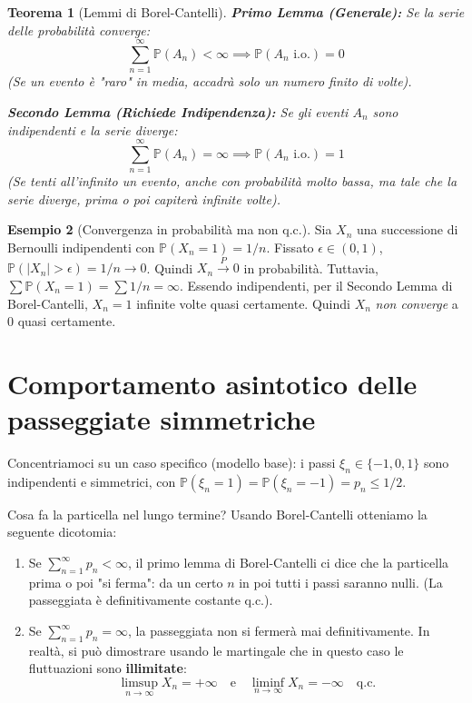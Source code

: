 \documentclass[11pt, a4paper]{report}
\theoremstyle{plain}
\newtheorem{theorem}{Teorema}[chapter]
\theoremstyle{definition}
\newtheorem{esempio}[theorem]{Esempio}
\theoremstyle{remark}
\newcommand{\PP}{\mathbb{P}}
\newcommand{\1}{\mathbf{1}}
\begin{document}
\begin{theorem}[Lemmi di Borel-Cantelli]
\textbf{Primo Lemma (Generale):} Se la serie delle probabilità converge:
\[ \sum_{n=1}^\infty \PP(A_n) < \infty \implies \PP(A_n \text{ i.o.}) = 0 \]
(Se un evento è "raro" in media, accadrà solo un numero finito di volte).

\textbf{Secondo Lemma (Richiede Indipendenza):} Se gli eventi $A_n$ sono indipendenti e la serie diverge:
\[ \sum_{n=1}^\infty \PP(A_n) = \infty \implies \PP(A_n \text{ i.o.}) = 1 \]
(Se tenti all'infinito un evento, anche con probabilità molto bassa, ma tale che la serie diverge, prima o poi capiterà infinite volte).
\end{theorem}

\begin{esempio}[Convergenza in probabilità ma non q.c.]
Sia $X_n$ una successione di Bernoulli indipendenti con $\PP(X_n = 1) = 1/n$.
Fissato $\epsilon \in (0, 1)$, $\PP(|X_n| > \epsilon) = 1/n \to 0$. Quindi $X_n \stackrel{P}{\to} 0$ in probabilità.
Tuttavia, $\sum \PP(X_n = 1) = \sum 1/n = \infty$. Essendo indipendenti, per il Secondo Lemma di Borel-Cantelli, $X_n = 1$ infinite volte quasi certamente. Quindi $X_n$ \emph{non converge} a 0 quasi certamente.
\end{esempio}

\section{Comportamento asintotico delle passeggiate simmetriche}

Concentriamoci su un caso specifico (modello base): i passi $\xi_n \in \{-1, 0, 1\}$ sono indipendenti e simmetrici, con $\PP(\xi_n = 1) = \PP(\xi_n = -1) = p_n \le 1/2$.

Cosa fa la particella nel lungo termine?
Usando Borel-Cantelli otteniamo la seguente dicotomia:
\begin{enumerate}
    \item Se $\sum_{n=1}^\infty p_n < \infty$, il primo lemma di Borel-Cantelli ci dice che la particella prima o poi "si ferma": da un certo $n$ in poi tutti i passi saranno nulli. (La passeggiata è definitivamente costante q.c.).
    \item Se $\sum_{n=1}^\infty p_n = \infty$, la passeggiata non si fermerà mai definitivamente. In realtà, si può dimostrare usando le martingale che in questo caso le fluttuazioni sono \textbf{illimitate}:
    \[ \limsup_{n \to \infty} X_n = +\infty \quad \text{e} \quad \liminf_{n \to \infty} X_n = -\infty \quad \text{q.c.} \]
\end{enumerate}
\end{document}
